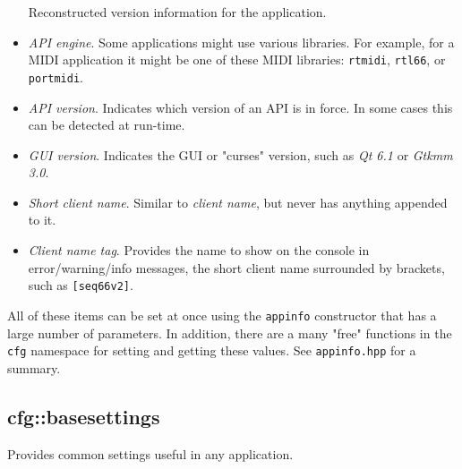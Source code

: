 \begin{itemize}
         Reconstructed version information for the application.
      \item \textsl{API engine}.
         Some applications might use various libraries.
         For example, for a MIDI application it might be one of these
         MIDI libraries:
         \texttt{rtmidi},
         \texttt{rtl66},
         or \texttt{portmidi}.
      \item \textsl{API version}.
         Indicates which version of an API is in force.
         In some cases this can be detected at run-time.
      \item \textsl{GUI version}.
         Indicates the GUI or "curses" version, such as \textsl{Qt 6.1}
         or \textsl{Gtkmm 3.0}.
      \item \textsl{Short client name}.
         Similar to \textsl{client name}, but never has anything appended
         to it.
      \item \textsl{Client name tag}.
         Provides the name to show on the console in error/warning/info messages,
         the short client name surrounded by brackets, such as
         \texttt{[seq66v2]}.
   \end{itemize}

   All of these items can be set at once using the \texttt{appinfo}
   constructor that has a large number of parameters.
   In addition, there are a many "free" functions in the \texttt{cfg}
   namespace for setting and getting these values.
   See \texttt{appinfo.hpp} for a summary.

\subsection{cfg::basesettings}
\label{subsec:cfg_namespace_basesettings}

   Provides common settings useful in any application.


